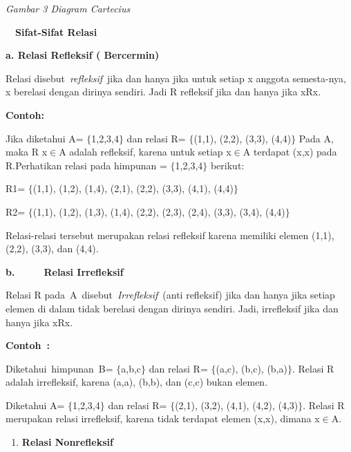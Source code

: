 \documentclass[11pt,fleqn]{book} %
\begin{document}
\begin{myEnumerate}
\begin{itemize}
\noindent \textit{Gambar 3 Diagram Cartecius}

\noindent 

\noindent 

 ~~\textbf{Sifat-Sifat Relasi}

\textbf{a. Relasi Refleksif ( Bercermin)}

\textbf{}

Relasi disebut~\textit{refleksif}~jika dan hanya jika untuk setiap x anggota semesta-nya, x berelasi dengan dirinya sendiri. Jadi R refleksif jika dan hanya jika xRx.

\textbf{}

\textbf{Contoh:}



\noindent Jika diketahui A= $\{$1,2,3,4$\}$ dan relasi R= $\{$(1,1), (2,2), (3,3), (4,4)$\}$ Pada A, maka R x$\mathrm{\in }$A adalah refleksif, karena untuk setiap x$\mathrm{\in }$A terdapat (x,x) pada R.Perhatikan relasi pada himpunan = $\{$1,2,3,4$\}$ berikut:



R1= $\{$(1,1), (1,2), (1,4), (2,1), (2,2), (3,3), (4,1), (4,4)$\}$

R2= $\{$(1,1), (1,2), (1,3), (1,4), (2,2), (2,3), (2,4), (3,3), (3,4), (4,4)$\}$



\noindent Relasi-relasi tersebut merupakan relasi refleksif karena memiliki elemen (1,1), (2,2), (3,3), dan (4,4).



\textbf{b.}~~~~~~\textbf{Relasi Irrefleksif}

\textbf{}

Relasi R pada~A~disebut~\textit{Irrefleksif}~(anti refleksif) jika dan hanya jika setiap elemen di dalam tidak berelasi dengan dirinya sendiri. Jadi, irrefleksif jika dan hanya jika xRx.

\textbf{Contoh~:}

\noindent 

\noindent Diketahui~himpunan~B= $\{$a,b,c$\}$ dan relasi R= $\{$(a,c), (b,c), (b,a)$\}$. Relasi R adalah irrefleksif, karena (a,a), (b,b), dan (c,c) bukan elemen.

\noindent 

\noindent Diketahui A= $\{$1,2,3,4$\}$ dan relasi R= $\{$(2,1), (3,2), (4,1), (4,2), (4,3)$\}$. Relasi R merupakan relasi irrefleksif, karena tidak terdapat elemen (x,x), dimana x$\mathrm{\in }$A.



\begin{enumerate}
\item  \textbf{Relasi Nonrefleksif}
\end{enumerate}


\end{itemize}
\end{myEnumerate}
\end{document}
